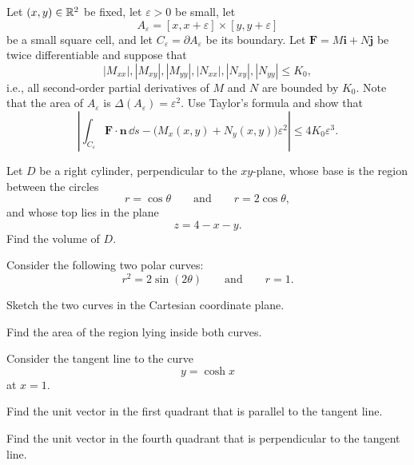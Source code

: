 \begin{problem}
Let $(x, y)\in\mathbb{R}^2$ be fixed, let $\varepsilon>0$ be small, let
\[
A_\varepsilon=[x, x+\varepsilon]\times[y, y+\varepsilon]
\]
be a small square cell, and let $C_\varepsilon=\partial A_\varepsilon$ be its boundary. Let $\mathbf F=M\mathbf i+N\mathbf j$ be twice differentiable and suppose that
\[
|M_{xx}|, |M_{xy}|, |M_{yy}|, |N_{xx}|, |N_{xy}|, |N_{yy}|\le K_0,
\]
i.e., all second-order partial derivatives of $M$ and $N$ are bounded by $K_0$. Note that the area of $A_\varepsilon$ is $\Delta(A_\varepsilon)=\varepsilon^2$. Use Taylor's formula and show that
\[
\left|
\int_{C_\varepsilon}\mathbf F\cdot\mathbf n\,\dd s
-
\bigl(M_x(x, y)+N_y(x, y)\bigr)\varepsilon^2
\right|
\le4K_0\varepsilon^3.
\]
\end{problem}

\begin{problem}
Let $D$ be a right cylinder, perpendicular to the $xy$-plane, whose base is the region between the circles
\[
r=\cos\theta
\qquad\text{and}\qquad
r=2\cos\theta,
\]
and whose top lies in the plane
\[
z=4-x-y.
\]
Find the volume of $D$.
\end{problem}

\begin{problem}
Consider the following two polar curves:
\[
r^2=2\sin(2\theta)
\qquad\text{and}\qquad
r=1.
\]
\begin{problemsubparts}
\item Sketch the two curves in the Cartesian coordinate plane.
\item Find the area of the region lying inside both curves.
\end{problemsubparts}
\end{problem}

\begin{problem}
Consider the tangent line to the curve
\[
y=\cosh x
\]
at $x=1$.
\begin{problemsubparts}
\item Find the unit vector in the first quadrant that is parallel to the tangent line.
\item Find the unit vector in the fourth quadrant that is perpendicular to the tangent line.
\end{problemsubparts}
\end{problem}

